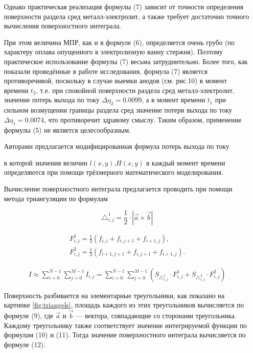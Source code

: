 \documentclass{article}
\begin{document}
Однако практическая реализация формулы (7) зависит от точности определения поверхности раздела сред металл-электролит, а также требует достаточно точного вычисления поверхностного интеграла. 

При этом величина МПР, как и в формуле (6), определяется очень грубо (по характеру оплава опущенного в электролизную ванну стержня). Поэтому практическое использование формулы (7) весьма затруднительно. Более того, как показали проведённые в работе исследования, формула (7) является противоречивой, поскольку в случае выемки анодов (см. рис.10) в момент времени $t_2$, т.е. при спокойной поверхности раздела сред металл-электролит, значение  потерь выхода по току $\Delta\eta_2 = 0.0099$, а в момент времени $t_1$ при сильном возмущении границы раздела сред значение потери выхода по току $\Delta\eta_1 = 0.0074$, что противоречит здравому смыслу.  Таким образом, применение формулы (5) не является целесообразным.

Авторами предлагается модифицированная формула потерь выхода по току 


в которой значения величин $l(x,y)$,$ H(x,y)$ в каждый момент времени определяются при помощи трёхмерного математического моделирования.

Вычисление поверхностного интеграла предлагается проводить при помощи метода триангуляции по формулам 

\begin{equation}
{\triangle_{i,j}^1} = \frac{1}{2} \cdot |\overrightarrow{a} \times \overrightarrow{b}|
\end{equation} \label{eq:triangsquare}

\begin{align}
F^1_{i,j} = \frac{1}{3}(f_{i,j}+f_{i,j+1}+f_{i+1,j}), \label{eq:f1}\\
F^2_{i,j} = \frac{1}{3}(f_{i+1,j+1}+f_{i,j+1}+f_{i+1,j}). \label{eq:f2}
\end{align}

\begin{align}\label{eq:trint}
I \approx \sum_{i=0}^{N-1} \sum_{j=0}^{M-1} I_{i,j} = \sum_{i=0}^{N-1} \sum_{j=0}^{M-1} (S_{\triangle_{i,j}^1} \cdot F_{i,j}^1 + S_{\triangle_{i,j}^2} \cdot F_{i,j}^2)
\end{align}

Поверхность разбивается на элементарные треугольники, как показано на картинке \ref{fig:triangels}, площадь каждого из этих треугольников вычисляется по формуле (9), где $\overrightarrow{a}$ и $\overrightarrow{b}$ — вектора, совпадающие со сторонами треугольника. Каждому треугольнику также соответствует значение интегрируемой функции по формулам (10) и (11). Тогда значение поверхностного интеграла вычисляется по формуле (12).
\end{document}
